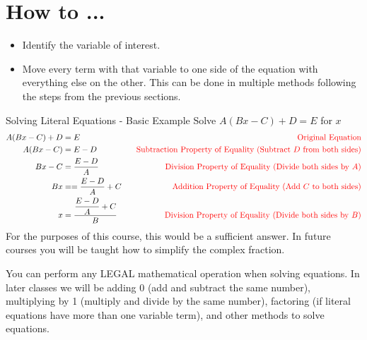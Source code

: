 \section{How to ...}
\begin{itemize}
    \item Identify the variable of interest. 
    \item Move every term with that variable to one side of the equation with everything else on the other. This can be done in multiple methods following the steps from the previous sections.
\end{itemize}
\begin{example}{Solving Literal Equations - Basic Example}{}
    Solve $A(Bx-C)+D=E$ for $x$
    \begin{align*}
        A(Bx-C)+D&=E&\;\;\;\textcolor{red}{\textrm{Original Equation}}\\
        A(Bx-C)&=E-D&\;\;\;\textcolor{red}{\textrm{Subtraction Property of Equality (Subtract $D$ from both sides)}}\\
        Bx-C &=\dfrac{E-D}{A}&\;\;\;\textcolor{red}{\textrm{Division Property of Equality (Divide both sides by $A$})}\\
        Bx &= =\dfrac{E-D}{A}+C&\;\;\;\textcolor{red}{\textrm{Addition Property of Equality (Add $C$ to both sides)}}\\
        x &= \dfrac{\dfrac{E-D}{A}+C}{B}&\;\;\;\textcolor{red}{\textrm{Division Property of Equality (Divide both sides by $B$})}
    \end{align*}
    For the purposes of this course, this would be a sufficient answer. In future courses you will be taught how to simplify the complex fraction.
\end{example} 
\begin{note}{}{}
You can perform any LEGAL mathematical operation when solving equations. In later classes we will be adding 0 (add and subtract the same number), multiplying by 1 (multiply and divide by the same number), factoring (if literal equations have more than one variable term), and other methods to solve equations.
\end{note}